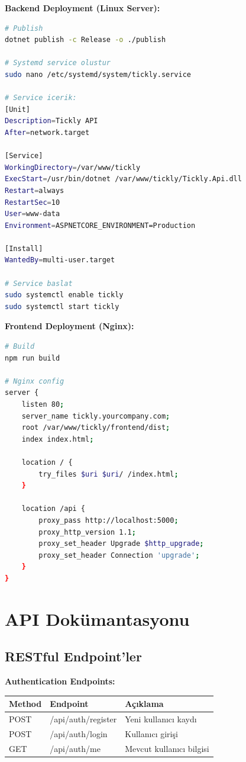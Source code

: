 \documentclass[12pt,a4paper]{article}
\begin{document}
\textbf{Backend Deployment (Linux Server):}

\begin{lstlisting}[language=bash]
# Publish
dotnet publish -c Release -o ./publish

# Systemd service olustur
sudo nano /etc/systemd/system/tickly.service

# Service icerik:
[Unit]
Description=Tickly API
After=network.target

[Service]
WorkingDirectory=/var/www/tickly
ExecStart=/usr/bin/dotnet /var/www/tickly/Tickly.Api.dll
Restart=always
RestartSec=10
User=www-data
Environment=ASPNETCORE_ENVIRONMENT=Production

[Install]
WantedBy=multi-user.target

# Service baslat
sudo systemctl enable tickly
sudo systemctl start tickly
\end{lstlisting}

\textbf{Frontend Deployment (Nginx):}

\begin{lstlisting}[language=bash]
# Build
npm run build

# Nginx config
server {
    listen 80;
    server_name tickly.yourcompany.com;
    root /var/www/tickly/frontend/dist;
    index index.html;
    
    location / {
        try_files $uri $uri/ /index.html;
    }
    
    location /api {
        proxy_pass http://localhost:5000;
        proxy_http_version 1.1;
        proxy_set_header Upgrade $http_upgrade;
        proxy_set_header Connection 'upgrade';
    }
}
\end{lstlisting}

\newpage

\section{API Dokümantasyonu}

\subsection{RESTful Endpoint'ler}

\textbf{Authentication Endpoints:}

\begin{table}[h]
\small
\begin{tabular}{|l|l|p{6cm}|}
\hline
\textbf{Method} & \textbf{Endpoint} & \textbf{Açıklama} \\
\hline
POST & /api/auth/register & Yeni kullanıcı kaydı \\
POST & /api/auth/login & Kullanıcı girişi \\
GET & /api/auth/me & Mevcut kullanıcı bilgisi \\
\hline
\end{tabular}
\end{table}
\end{document}
